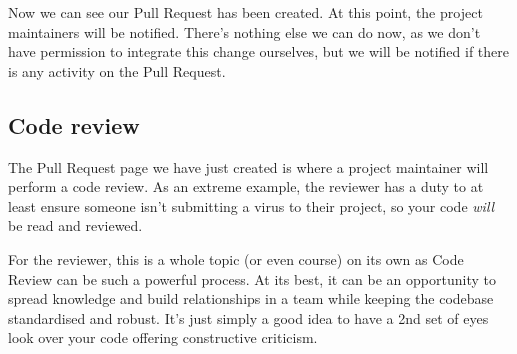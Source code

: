 \documentclass[
  letterpaper,
  DIV=11,
  numbers=noendperiod]{scrartcl}
\begin{document}
Now we can see our Pull Request has been created. At this point, the
project maintainers will be notified. There's nothing else we can do
now, as we don't have permission to integrate this change ourselves, but
we will be notified if there is any activity on the Pull Request.

\subsection{Code review}\label{code-review}

The Pull Request page we have just created is where a project maintainer
will perform a code review. As an extreme example, the reviewer has a
duty to at least ensure someone isn't submitting a virus to their
project, so your code \emph{will} be read and reviewed.

For the reviewer, this is a whole topic (or even course) on its own as
Code Review can be such a powerful process. At its best, it can be an
opportunity to spread knowledge and build relationships in a team while
keeping the codebase standardised and robust. It's just simply a good
idea to have a 2nd set of eyes look over your code offering constructive
criticism.
\end{document}
